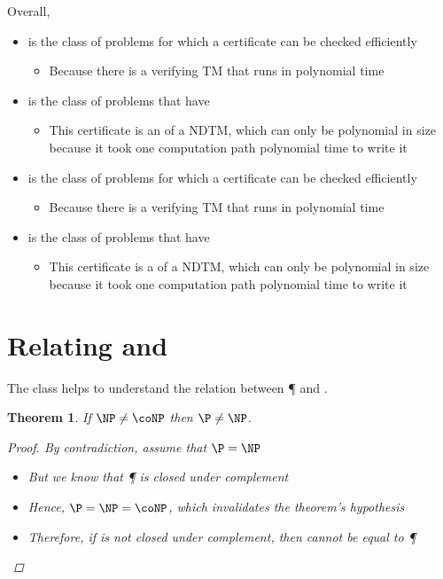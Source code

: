 \documentclass[a4paper]{report}
\newtheorem{theo}{Theorem}
\newcommand{\bookref}[3]{\marginpar{\faBook{}~#1\\Chapter #2\\Section #3}}
\theoremstyle{definition}
\begin{document}
Overall,
\begin{itemize}
\item \NP{} is the class of problems for which a  certificate can be checked efficiently
\begin{itemize}
\item Because there is a verifying TM that runs in polynomial time
\end{itemize}
\item \NP{} is the class of problems that have 
\begin{itemize}
\item This certificate is an  of a NDTM, which can only be polynomial in size because it took one computation path polynomial time to write it
\end{itemize}
\item \coNP{} is the class of problems for which a  certificate can be checked efficiently
\begin{itemize}
\item Because there is a verifying TM that runs in polynomial time
\end{itemize}
\item \coNP{} is the class of problems that have 
\begin{itemize}
\item This certificate is a  of a NDTM, which can only be polynomial in size because it took one computation path polynomial time to write it
\end{itemize}
\end{itemize}



\section{Relating \NP{} and \coNP}
\bookref{ER}{28}{28.8}
The class \coNP{} helps to understand the relation between \P{} and \NP{}.

\begin{theo}
If $\NP \neq \coNP$ then $\P \neq \NP$.
\begin{proof}
By contradiction, assume that $\P = \NP$
\begin{itemize}
\item But we know that \P{} is closed under complement
\item Hence, $\P = \NP = \coNP$, which invalidates the theorem's hypothesis
\item Therefore, if \NP{} is not closed under complement, then \NP{} cannot be equal to \P{}
\end{itemize}
\end{proof}
\end{theo}
\end{document}
